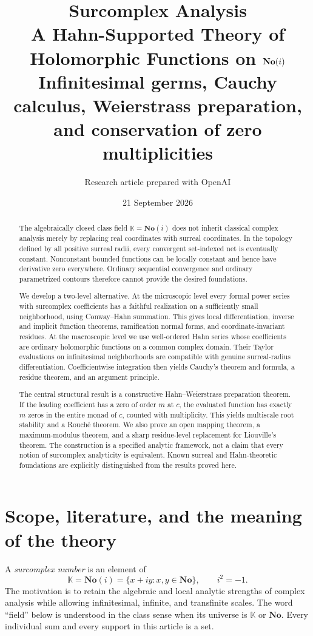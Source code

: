\documentclass[11pt,oneside]{article}
\title{\vspace{-1cm}\textbf{Surcomplex Analysis}\\[4pt]
\Large A Hahn-Supported Theory of Holomorphic Functions on $\No(i)$\\[7pt]
\large Infinitesimal germs, Cauchy calculus, Weierstrass preparation,\\and conservation of zero multiplicities}
\author{Research article prepared with OpenAI}
\date{21 September 2026}
\theoremstyle{definition}\newtheorem{definition}[theorem]{Definition}
\newcommand{\No}{\mathbf{No}}
\newcommand{\K}{\mathbb K}
\begin{document}
\maketitle
\begin{abstract}
The algebraically closed class field $\K=\No(i)$ does not inherit classical complex analysis merely by replacing real coordinates with surreal coordinates. In the topology defined by all positive surreal radii, every convergent set-indexed net is eventually constant. Nonconstant bounded functions can be locally constant and hence have derivative zero everywhere. Ordinary sequential convergence and ordinary parametrized contours therefore cannot provide the desired foundations.

We develop a two-level alternative. At the microscopic level every formal power series with surcomplex coefficients has a faithful realization on a sufficiently small neighborhood, using Conway--Hahn summation. This gives local differentiation, inverse and implicit function theorems, ramification normal forms, and coordinate-invariant residues. At the macroscopic level we use well-ordered Hahn series whose coefficients are ordinary holomorphic functions on a common complex domain. Their Taylor evaluations on infinitesimal neighborhoods are compatible with genuine surreal-radius differentiation. Coefficientwise integration then yields Cauchy's theorem and formula, a residue theorem, and an argument principle.

The central structural result is a constructive Hahn--Weierstrass preparation theorem. If the leading coefficient has a zero of order $m$ at $c$, the evaluated function has exactly $m$ zeros in the entire monad of $c$, counted with multiplicity. This yields multiscale root stability and a Rouch\'e theorem. We also prove an open mapping theorem, a maximum-modulus theorem, and a sharp residue-level replacement for Liouville's theorem. The construction is a specified analytic framework, not a claim that every notion of surcomplex analyticity is equivalent. Known surreal and Hahn-theoretic foundations are explicitly distinguished from the results proved here.
\end{abstract}
\clearpage
\setcounter{tocdepth}{1}
\tableofcontents
\clearpage

\section{Scope, literature, and the meaning of the theory}\label{sec:intro}
A \emph{surcomplex number} is an element of
\[
 \K=\No(i)=\{x+iy:x,y\in\No\},\qquad i^2=-1.
\]
The motivation is to retain the algebraic and local analytic strengths of complex analysis while allowing infinitesimal, infinite, and transfinite scales. The word ``field'' below is understood in the class sense when its universe is $\K$ or $\No$. Every individual sum and every support in this article is a set.
\end{document}

